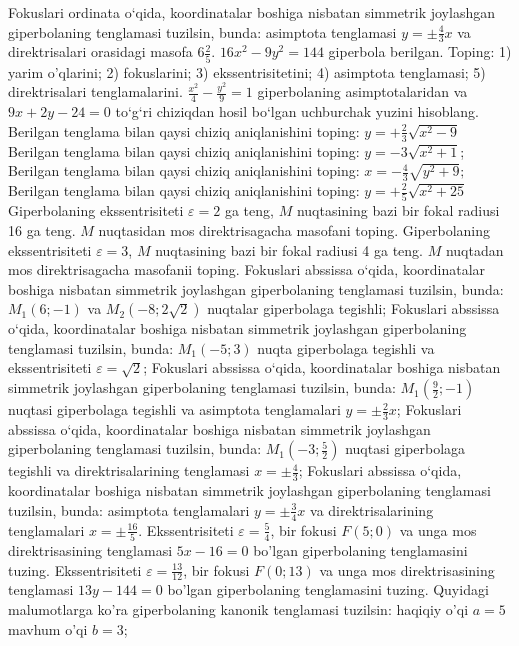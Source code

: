 Fokuslari ordinata o‘qida, koordinatalar boshiga nisbatan simmetrik joylashgan giperbolaning tenglamasi tuzilsin, bunda: asimptota tenglamasi $y= \pm \frac{4}{3} x$ va direktrisalari orasidagi masofa $6 \frac{2}{5}$.
$16 x^2-9 y^2=144$ giperbola berilgan. Toping: 1) yarim o'qlarini; 2) fokuslarini; 3) ekssentrisitetini; 4) asimptota tenglamasi; 5) direktrisalari tenglamalarini.
$\frac{x^2}{4}-\frac{y^2}{9}=1$ giperbolaning asimptotalaridan va $9 x+2 y-24=0$ to‘g‘ri chiziqdan hosil bo‘lgan uchburchak yuzini hisoblang.
Berilgan tenglama bilan qaysi chiziq aniqlanishini toping: $y=+\frac{2}{3} \sqrt{x^2-9}$
Berilgan tenglama bilan qaysi chiziq aniqlanishini toping: $y=-3 \sqrt{x^2+1}$;
Berilgan tenglama bilan qaysi chiziq aniqlanishini toping: $x=-\frac{4}{3} \sqrt{y^2+9} ;$
Berilgan tenglama bilan qaysi chiziq aniqlanishini toping: $y=+\frac{2}{5} \sqrt{x^2+25}$
Giperbolaning ekssentrisiteti $\varepsilon=2$ ga teng, $M$ nuqtasining bazi bir fokal radiusi 16 ga teng. $M$ nuqtasidan mos direktrisagacha masofani toping.
Giperbolaning ekssentrisiteti $\varepsilon=3$, $M$ nuqtasining bazi bir fokal radiusi 4 ga teng. $M$ nuqtadan mos direktrisagacha masofanii toping.
Fokuslari abssissa o‘qida, koordinatalar boshiga nisbatan simmetrik joylashgan giperbolaning tenglamasi tuzilsin, bunda: $M_1(6 ;-1)$ va $M_2(-8 ; 2 \sqrt{2})$ nuqtalar giperbolaga tegishli;
Fokuslari abssissa o‘qida, koordinatalar boshiga nisbatan simmetrik joylashgan giperbolaning tenglamasi tuzilsin, bunda: $M_1(-5 ; 3)$ nuqta giperbolaga tegishli va ekssentrisiteti $\varepsilon=\sqrt{2}$;
Fokuslari abssissa o‘qida, koordinatalar boshiga nisbatan simmetrik joylashgan giperbolaning tenglamasi tuzilsin, bunda: $M_1\left(\frac{9}{2} ;-1\right)$ nuqtasi giperbolaga tegishli va asimptota tenglamalari $y= \pm \frac{2}{3} x$;
Fokuslari abssissa o‘qida, koordinatalar boshiga nisbatan simmetrik joylashgan giperbolaning tenglamasi tuzilsin, bunda: $M_1\left(-3 ; \frac{5}{2}\right)$ nuqtasi giperbolaga tegishli va direktrisalarining tenglamasi $x= \pm \frac{4}{3}$;
Fokuslari abssissa o‘qida, koordinatalar boshiga nisbatan simmetrik joylashgan giperbolaning tenglamasi tuzilsin, bunda: asimptota tenglamalari $y= \pm \frac{3}{4} x$ va direktrisalarining tenglamalari $x= \pm \frac{16}{5}$.
Ekssentrisiteti $\varepsilon=\frac{5}{4}$, bir fokusi $F(5 ; 0)$ va unga mos direktrisasining tenglamasi $5 x-16=0$ bo'lgan giperbolaning tenglamasini tuzing.
Ekssentrisiteti $\varepsilon=\frac{13}{12}$, bir fokusi $F(0 ; 13)$ va unga mos direktrisasining tenglamasi $13 y-144=0$ bo'lgan giperbolaning tenglamasini tuzing.
Quyidagi malumotlarga ko'ra giperbolaning kanonik tenglamasi tuzilsin: haqiqiy o'qi $a=5$ mavhum o'qi $b=3$;
